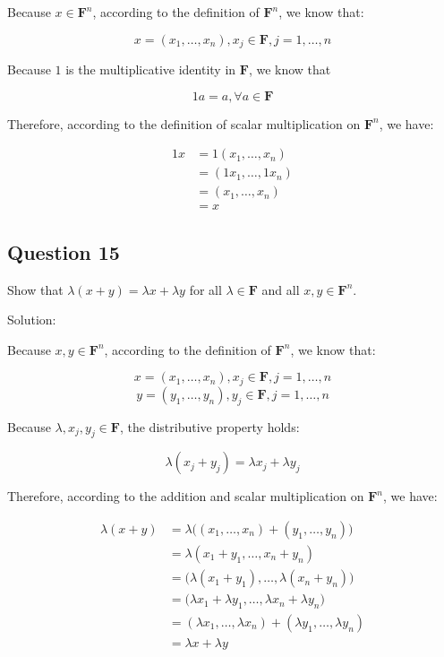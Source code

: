 \documentclass[12pt, letterpaper, oneside]{book}
\begin{document}
Because $x \in \mathbf{F}^n$, according to the definition of $\mathbf{F}^n$, we
know that:

\[ x = (x_1, \ldots, x_n), x_j \in \mathbf{F}, j = 1, \ldots, n \]

Because $1$ is the multiplicative identity in $\mathbf{F}$, we know that

\[ 1a = a, \forall a \in \mathbf{F} \]

Therefore, according to the definition of scalar multiplication on
$\mathbf{F}^n$, we have:

\begin{equation*}
  \begin{split}
    1x
    & = 1(x_1, \ldots, x_n) \\
    & = (1 x_1, \ldots, 1 x_n) \\
    & = (x_1, \ldots, x_n) \\
    & = x
  \end{split}
\end{equation*}

\subsection{Question 15}

Show that $\lambda(x + y) = \lambda x + \lambda y$ for all $\lambda \in
\mathbf{F}$ and all $x, y \in \mathbf{F}^n$.

Solution:

Because $x, y \in \mathbf{F}^n$, according to the definition of $\mathbf{F}^n$,
we know that:

\[ x = (x_1, \ldots, x_n), x_j \in \mathbf{F}, j = 1, \ldots, n \]
\[ y = (y_1, \ldots, y_n), y_j \in \mathbf{F}, j = 1, \ldots, n \]

Because $\lambda, x_j, y_j \in \mathbf{F}$, the distributive property holds:

\[ \lambda(x_j + y_j) = \lambda x_j + \lambda y_j \]

Therefore, according to the addition and scalar multiplication on
$\mathbf{F}^n$, we have:

\begin{equation*}
  \begin{split}
    \lambda(x + y)
    & = \lambda \bigl((x_1, \ldots, x_n) + (y_1, \ldots, y_n)\bigr) \\
    & = \lambda (x_1 + y_1, \ldots, x_n + y_n) \\
    & = \bigl(\lambda(x_1 + y_1), \ldots, \lambda(x_n + y_n)\bigr) \\
    & = \bigl(\lambda x_1 + \lambda y_1, \ldots,
      \lambda x_n + \lambda y_n\bigr) \\
    & = (\lambda x_1, \ldots, \lambda x_n) +
      (\lambda y_1, \ldots, \lambda y_n) \\
    & = \lambda x + \lambda y
  \end{split}
\end{equation*}
\end{document}
